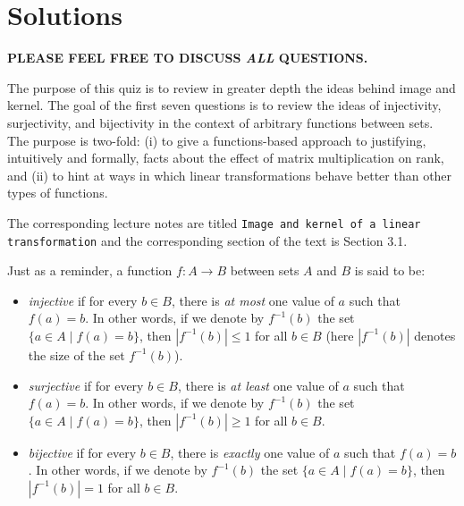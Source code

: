 \documentclass[10pt]{amsart}
\begin{document}
\section{Solutions}

{\bf PLEASE FEEL FREE TO DISCUSS {\em ALL} QUESTIONS.}

The purpose of this quiz is to review in greater depth the ideas
behind image and kernel. The goal of the first seven questions is to
review the ideas of injectivity, surjectivity, and bijectivity in the
context of arbitrary functions between sets. The purpose is two-fold:
(i) to give a functions-based approach to justifying, intuitively and
formally, facts about the effect of matrix multiplication on rank, and
(ii) to hint at ways in which linear transformations behave better
than other types of functions.

The corresponding lecture notes are titled {\tt Image and kernel of a
  linear transformation} and the corresponding section of the text is
Section 3.1.

Just as a reminder, a function $f:A \to B$ between sets $A$ and $B$ is
said to be:

\begin{itemize}
\item {\em injective} if for every $b \in B$, there is {\em at most}
  one value of $a$ such that $f(a) = b$. In other words, if we denote
  by $f^{-1}(b)$ the set $\{ a \in A \mid f(a) = b \}$, then
  $|f^{-1}(b)| \le 1$ for all $b \in B$ (here $|f^{-1}(b)|$ denotes
  the size of the set $f^{-1}(b)$).
\item {\em surjective} if for every $b \in B$, there is {\em at least}
  one value of $a$ such that $f(a) = b$. In other words, if we denote
  by $f^{-1}(b)$ the set $\{ a \in A \mid f(a) = b \}$, then
  $|f^{-1}(b)| \ge 1$ for all $b \in B$.
\item {\em bijective} if for every $b \in B$, there is {\em exactly}
  one value of $a$ such that $f(a) = b$. In other words, if we denote
  by $f^{-1}(b)$ the set $\{ a \in A \mid f(a) = b \}$, then
  $|f^{-1}(b)| = 1$ for all $b \in B$.
\end{itemize}
\end{document}
